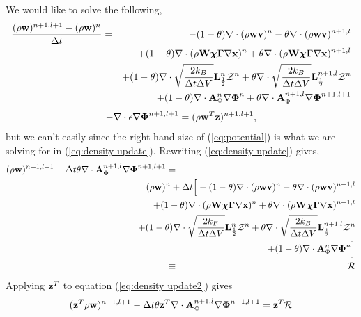 \documentclass[final]{siamltex}
\def\Ab {{\bf A}}
\def\Lb {{\bf L}}
\def\vb {{\bf v}}
\def\wb {{\bf w}}
\def\Wb {{\bf W}}
\def\xb {{\bf x}}
\def\zb {{\bf z}}
\def\chib   {\boldsymbol{\chi}}
\def\Gammab {\boldsymbol{\Gamma}}
\def\Phib   {\boldsymbol{\Phi}}
\def\half   {\frac{1}{2}}
\begin{document}
We would like to solve the following,
\begin{eqnarray}
\frac{(\rho\wb)^{n+1,l+1} - (\rho\wb)^n}{\Delta t} &=&  -(1-\theta)\nabla\cdot(\rho\wb\vb)^n - \theta\nabla\cdot(\rho\wb\vb)^{n+1,l}\nonumber\\
&&+ (1-\theta)\nabla\cdot(\rho\Wb\chib\Gammab\nabla\xb)^n + \theta\nabla\cdot(\rho\Wb\chib\Gammab\nabla\xb)^{n+1,l} \nonumber\\
&&+ (1-\theta)\nabla\cdot\sqrt{\frac{2k_B}{\Delta t\Delta V}}\Lb_\half^n\mathcal{Z}^n
+ \theta\nabla\cdot\sqrt{\frac{2k_B}{\Delta t\Delta V}}\Lb_\half^{n+1,l}\mathcal{Z}^n\nonumber\\
&&+ (1-\theta)\nabla\cdot \Ab_\Phi^n\nabla\Phib^n + \theta\nabla\cdot \Ab_\Phi^{n+1,l}\nabla\Phib^{n+1,l+1}
\label{eq:density update}
\end{eqnarray}
\begin{equation}
-\nabla\cdot\epsilon\nabla\Phib^{n+1,l+1} = (\rho\wb^T\zb)^{n+1,l+1},\label{eq:potential}
\end{equation}
but we can't easily since the right-hand-size of (\ref{eq:potential}) is what we are
solving for in (\ref{eq:density update}).  Rewriting (\ref{eq:density update}) gives,
\begin{eqnarray}
(\rho\wb)^{n+1,l+1} - \Delta t\theta\nabla\cdot \Ab_\Phi^{n+1,l}\nabla\Phib^{n+1,l+1} &=& \nonumber\\
&&\hspace{-1.5in}(\rho\wb)^n + \Delta t\Big[-(1-\theta)\nabla\cdot(\rho\wb\vb)^n -\theta\nabla\cdot(\rho\wb\vb)^{n+1,l}\nonumber\\
&&\hspace{-.7in}+ (1-\theta)\nabla\cdot(\rho\Wb\chib\Gammab\nabla\xb)^n + \theta\nabla\cdot(\rho\Wb\chib\Gammab\nabla\xb)^{n+1,l}\nonumber\\
&&\hspace{-.7in}+ (1-\theta)\nabla\cdot\sqrt{\frac{2k_B}{\Delta t\Delta V}}\Lb_\half^n\mathcal{Z}^n + \theta\nabla\cdot\sqrt{\frac{2k_B}{\Delta t\Delta V}}\Lb_\half^{n+1,l}\mathcal{Z}^n\nonumber\\
&&\hspace{-.7in}+ (1-\theta)\nabla\cdot \Ab_\Phi^n\nabla\Phib^n\Big]\nonumber\\
&\equiv& \mathcal{R}\label{eq:density update2}
\end{eqnarray}
Applying $\zb^T$ to equation (\ref{eq:density update2}) gives
\begin{equation}
(\zb^T\rho\wb)^{n+1,l+1} - \Delta t\theta\zb^T\nabla\cdot \Ab_\Phi^{n+1,l}\nabla\Phib^{n+1,l+1} = \zb^T\mathcal{R}\label{eq:density update3}
\end{equation}
\end{document}
